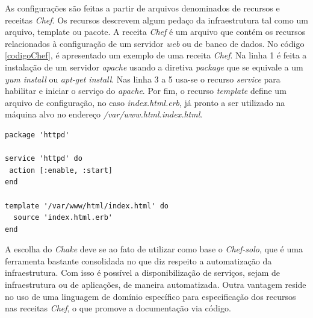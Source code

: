 As configurações são feitas a partir de arquivos denominados de recursos e receitas \textit{Chef}. Os recursos descrevem algum pedaço da infraestrutura tal como um arquivo, template ou pacote. A receita \textit{Chef} é um arquivo que contém os recursos relacionados à configuração de um servidor \textit{web} ou de banco de dados. No código \ref{codigoChef}, é apresentado um exemplo de uma receita \textit{Chef}. Na linha 1 é feita a instalação de um servidor \textit{apache} usando a diretiva \textit{package} que se equivale a um \textit{yum install} ou \textit{apt-get install}. Nas linha 3 a 5 usa-se o recurso \textit{service} para habilitar e iniciar o serviço do \textit{apache}. Por fim, o recurso \textit{template} define um arquivo de configuração, no caso \textit{index.html.erb}, já pronto a ser utilizado na máquina alvo no endereço \textit{/var/www.html.index.html}.

\begin{lstlisting}[caption={Código exemplo de uma receita Chef}, label=codigoChef]
package 'httpd'

service 'httpd' do
 action [:enable, :start]
end

template '/var/www/html/index.html' do
  source 'index.html.erb'
end
\end{lstlisting}

A escolha do \textit{Chake} deve se ao fato de utilizar como base o \textit{Chef-solo}, que é uma ferramenta bastante consolidada no que diz respeito a automatização da infraestrutura. Com isso é possível a disponibilização de serviços, sejam de infraestrutura ou de aplicações, de maneira automatizada. Outra vantagem reside no uso de uma linguagem de domínio específico para especificação dos recursos nas receitas \textit{Chef}, o que promove a documentação via código.

